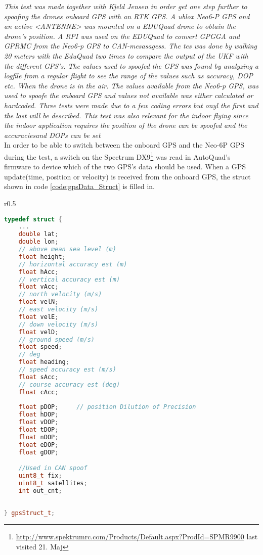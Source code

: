 \textit{This test was made together with Kjeld Jensen in order get one step further to spoofing the drones onboard GPS with an RTK GPS. A ublox Neo6-P GPS and an active <ANTENNE> was mounted on a EDUQuad drone to obtain the drone's position. A RPI was used on the EDUQuad to convert GPGGA and GPRMC from the Neo6-p GPS to CAN-mesasagess. The tes was done by walking 20 meters with the EduQuad two times to compare the output of the UKF with the different GPS's.
The values used to spoofed the GPS was found by analyzing a logfile from a regular flight to see the range of the values such as accuracy, DOP etc. When the drone is in the air. The values available from the Neo6-p GPS, was used to spoofe the onboard GPS and values not available was either calculated or hardcoded. Three tests were made due to a few coding errors but onyl the first and the last will be described. This test was also relevant for the indoor flying since the indoor application requires the position of the drone can be spoofed and the accuraciesand DOPs can be set}\\
In order to be able to switch between the onboard GPS and the Neo-6P GPS during the test, a switch on the Spectrum DX9\footnote{\url{http://www.spektrumrc.com/Products/Default.aspx?ProdId=SPMR9900} last visited 21. Maj} was read in AutoQuad's firmware to device which of the two GPS's data should be used. When a GPS update(time, position or velocity) is received from the onboard GPS, the struct shown in code \ref{code:gpsData_Struct} is filled in.


\begin{wrapfigure}{r}{0.5\textwidth}
  \begin{center}
\begin{lstlisting}[language = c++, caption = Quality checks added to discard bad positions, label=code:gpsData_Struct]
typedef struct {
  	...
    double lat;
    double lon;
    // above mean sea level (m)
    float height;   
    // horizontal accuracy est (m)
    float hAcc;     
    // vertical accuracy est (m)
    float vAcc;    
    // north velocity (m/s)
    float velN;     
    // east velocity (m/s)
    float velE;     
    // down velocity (m/s)
    float velD;    
    // ground speed (m/s) 
    float speed;   
    // deg 
    float heading;  
    // speed accuracy est (m/s)
    float sAcc;     
    // course accuracy est (deg)
    float cAcc;   
    
    float pDOP;     // position Dilution of Precision
    float hDOP;
    float vDOP;
    float tDOP;
    float nDOP;
    float eDOP;
    float gDOP;

    //Used in CAN spoof
    uint8_t fix;
    uint8_t satellites;
    int out_cnt;
 
    
} gpsStruct_t;
\end{lstlisting}
  \end{center}
  \end{wrapfigure}


